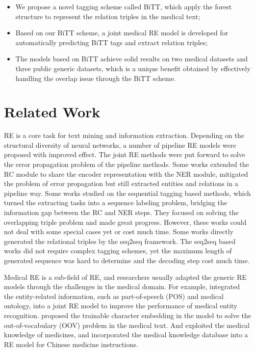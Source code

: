 \documentclass[conference]{IEEEtran}
\begin{document}
\begin{itemize}
    \item We propose a novel tagging scheme called BiTT, which apply the forest structure to represent the relation triples in the medical text;
	\item Based on our BiTT scheme, a joint medical RE model is developed for automatically predicting BiTT tags and extract relation triples;
	\item The models based on BiTT achieve solid results on two medical datasets and  three public generic datasets, which is a unique benefit obtained by effectively handling the overlap issue through the BiTT scheme.
\end{itemize} \section{Related Work}
RE is a core task for text mining and information extraction. Depending on the structural diversity of neural networks, a number of pipeline RE models \cite{Zeng2014Relation,Xu2015Classifying,Vu2016Combining} were proposed with improved effect. The joint RE methods were put forward to solve the error propagation problem of the pipeline methods. Some works \cite{Miwa2016End,Katiyar2016Investigating} extended the RC module to share the encoder representation with the NER module, mitigated the problem of error propagation but still extracted entities and relations in a pipeline way. Some works \cite{Zheng2017Joint,Dai2019Joint,Wei2020CasRel} studied on the sequential tagging based methods, which turned the extracting tasks into a sequence labeling problem, bridging the information gap between the RC and NER steps. They focused on solving the overlapping triple problem and made great progress. However, these works could not deal with some special cases yet or cost much time. Some works \cite{Zeng2018Extracting,Nayak2019ptrnetdecoding,Zeng2020copymtl} directly generated the relational triples by the seq2seq framework. The seq2seq based works did not require complex tagging schemes, yet the maximum length of generated sequence was hard to determine and the decoding step cost much time.

Medical RE is a sub-field of RE, and researchers usually adapted the generic RE models through the challenges in the medical domain. For example, \cite{Li2016Joint} integrated the entity-related information, such as part-of-speech (POS) and medical ontology, into a joint RE model to improve the performance of medical entity recognition. \cite{Li2017A} proposed the trainable character embedding in the model to solve the out-of-vocabulary (OOV) problem in the medical text. And \cite{Qi2021KeMRE} exploited the medical knowledge of medicines, and incorporated the medical knowledge database into a RE model for Chinese medicine instructions.
\end{document}
